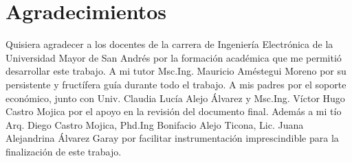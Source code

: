 \documentclass[10pt]{report}
\numberwithin{equation}{chapter}
\numberwithin{algorithm}{chapter}
\begin{document}
\chapter*{Agradecimientos}
\vspace{2cm}\hspace{2cm}\begin{minipage}{9cm}
Quisiera agradecer a los docentes de la carrera de Ingeniería Electrónica de la Universidad Mayor de San Andrés por la formación académica que me permitió desarrollar este trabajo. A mi tutor Msc.Ing. Mauricio Améstegui Moreno por su persistente y fructífera guía durante todo el trabajo. A mis padres por el soporte económico, junto con Univ. Claudia Lucía Alejo Álvarez y Msc.Ing. Víctor Hugo Castro Mojica por el apoyo en la revisión del documento final. Además a mi tío Arq. Diego Castro Mojica, Phd.Ing Bonifacio Alejo Ticona, Lic. Juana Alejandrina Álvarez Garay por facilitar instrumentación imprescindible para la finalización de este trabajo.\end{minipage}
\thispagestyle{empty}
\setcounter{page}{1}
\newpage
\end{document}
